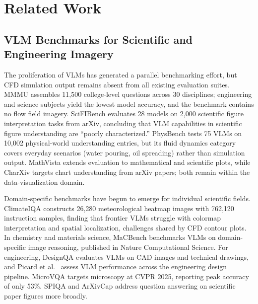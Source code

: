\documentclass[preprint,12pt]{elsarticle}
\begin{document}

\section{Related Work}

\subsection{VLM Benchmarks for Scientific and Engineering Imagery}

The proliferation of VLMs has generated a parallel benchmarking effort, but
CFD simulation output remains absent from all existing evaluation suites. MMMU
\cite{yue.etal2024MMMUMassive} assembles 11,500 college-level questions across 30 disciplines;
engineering and science subjects yield the lowest model accuracy, and the benchmark
contains no flow field imagery. SciFIBench \cite{roberts.etal2024SciFIBenchBenchmarking} evaluates 28 models on
2,000 scientific figure interpretation tasks from arXiv, concluding that VLM
capabilities in scientific figure understanding are ``poorly characterized.''
PhysBench \cite{chow.etal2025PhysBenchBenchmarking} tests 75 VLMs on 10,002 physical-world
understanding entries, but its fluid dynamics category covers everyday scenarios
(water pouring, oil spreading) rather than simulation output. MathVista
\cite{lu.etal2024MathVistaEvaluating} extends evaluation to mathematical and scientific plots, while
CharXiv \cite{wang.etal2024CharXivCharting} targets chart understanding from arXiv papers; both
remain within the data-visualization domain.

Domain-specific benchmarks have begun to emerge for individual scientific fields.
ClimateIQA \cite{chen.etal2024ClimateIQAMultimodal} constructs 26,280 meteorological heatmap images
with 762,120 instruction samples, finding that frontier VLMs struggle with colormap
interpretation and spatial localization, challenges shared by CFD contour plots. In
chemistry and materials science, MaCBench \cite{alampara.etal2025ProbingLimitations} benchmarks VLMs
on domain-specific image reasoning, published in Nature Computational Science. For
engineering, DesignQA \cite{doris.etal2024DesignQAMultimodal} evaluates VLMs on CAD images and
technical drawings, and Picard et al.\ \cite{picard.etal2025ConceptManufacturing} assess VLM
performance across the engineering design pipeline. MicroVQA \cite{burgess.etal2025MicroVQAMultimodal}
targets microscopy at CVPR 2025, reporting peak accuracy of only 53\%. SPIQA
\cite{pramanick.etal2024SPIQADataset} and ArXivCap \cite{li.etal2024MultimodalArXiv} address question
answering on scientific paper figures more broadly.
\end{document}

